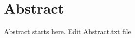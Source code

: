 \chapter*{Abstract}
\label{ch:abstract}


\hspace*{0.3cm}
\indent Abstract starts here. Edit Abstract.txt file



